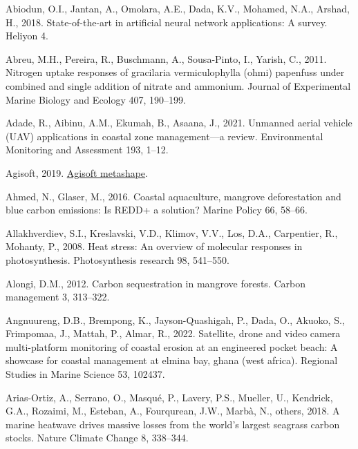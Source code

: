 \documentclass[
  letterpaper,
  11pt,
  english,
  singlespacing,
  headsepline]{MastersDoctoralThesis}
\newlength{\cslhangindent}
\newenvironment{CSLReferences}[2] %
 {\begin{list}{}{%
  \setlength{\itemindent}{0pt}
  \setlength{\leftmargin}{0pt}
  \setlength{\parsep}{0pt}
  \ifodd #1
   \setlength{\leftmargin}{\cslhangindent}
   \setlength{\itemindent}{-1\cslhangindent}
  \fi
  \setlength{\itemsep}{#2\baselineskip}}}
 {\end{list}}
\begin{document}
\begin{CSLReferences}{1}{0}
Abiodun, O.I., Jantan, A., Omolara, A.E., Dada, K.V., Mohamed, N.A.,
Arshad, H., 2018. State-of-the-art in artificial neural network
applications: A survey. Heliyon 4.

Abreu, M.H., Pereira, R., Buschmann, A., Sousa-Pinto, I., Yarish, C.,
2011. Nitrogen uptake responses of gracilaria vermiculophylla (ohmi)
papenfuss under combined and single addition of nitrate and ammonium.
Journal of Experimental Marine Biology and Ecology 407, 190--199.

Adade, R., Aibinu, A.M., Ekumah, B., Asaana, J., 2021. Unmanned aerial
vehicle (UAV) applications in coastal zone management---a review.
Environmental Monitoring and Assessment 193, 1--12.

Agisoft, 2019. \href{https://www.agisoft.com/}{Agisoft metashape}.

Ahmed, N., Glaser, M., 2016. Coastal aquaculture, mangrove deforestation
and blue carbon emissions: Is REDD+ a solution? Marine Policy 66,
58--66.

Allakhverdiev, S.I., Kreslavski, V.D., Klimov, V.V., Los, D.A.,
Carpentier, R., Mohanty, P., 2008. Heat stress: An overview of molecular
responses in photosynthesis. Photosynthesis research 98, 541--550.

Alongi, D.M., 2012. Carbon sequestration in mangrove forests. Carbon
management 3, 313--322.

Angnuureng, D.B., Brempong, K., Jayson-Quashigah, P., Dada, O., Akuoko,
S., Frimpomaa, J., Mattah, P., Almar, R., 2022. Satellite, drone and
video camera multi-platform monitoring of coastal erosion at an
engineered pocket beach: A showcase for coastal management at elmina
bay, ghana (west africa). Regional Studies in Marine Science 53, 102437.

Arias-Ortiz, A., Serrano, O., Masqué, P., Lavery, P.S., Mueller, U.,
Kendrick, G.A., Rozaimi, M., Esteban, A., Fourqurean, J.W., Marbà, N.,
others, 2018. A marine heatwave drives massive losses from the world's
largest seagrass carbon stocks. Nature Climate Change 8, 338--344.


\end{CSLReferences}
\end{document}
